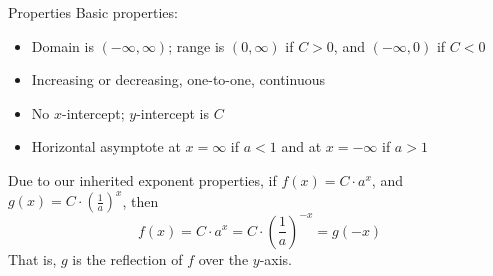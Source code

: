 \documentclass[]{beamer}
\begin{document}
	\begin{frame}{Properties}
		Basic properties:
		\begin{itemize}
			\item Domain is $(-\infty, \infty)$; range is $(0,\infty)$ if $C> 0$, and $(-\infty, 0)$ if $C < 0$
			\pause\vfill
			\item Increasing or decreasing, one-to-one, continuous
			\pause\vfill
			\item No $x$-intercept; $y$-intercept is $C$
			\pause\vfill
			\item Horizontal asymptote at $x = \infty$ if $a < 1$ and at $x =-\infty$ if $a > 1$
		\end{itemize}
		\pause\vfill
		Due to our inherited exponent properties, if $f(x) = C\cdot a^x$, and $g(x) = C\cdot \left(\frac{1}{a}\right)^x$, then
		\pause\vfill
		\begin{equation*}
			f(x) = C\cdot a^x = C\cdot\left(\frac{1}{a}\right)^{-x} = g(-x)
		\end{equation*}
		\vfill
		That is, $g$ is the reflection of $f$ over the $y$-axis.
	\end{frame}
\end{document}
